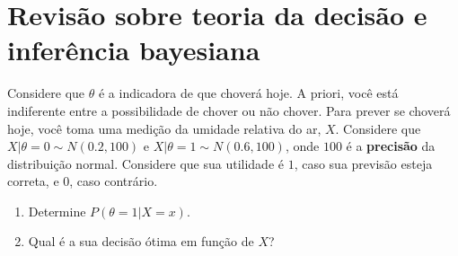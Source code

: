 \section{Revisão sobre teoria da decisão e 
         inferência bayesiana}

\begin{exercise}
 Considere que $\theta$ é a
 indicadora de que choverá hoje.
 A priori, você está indiferente entre 
 a possibilidade de chover ou não chover.
 Para prever se choverá hoje, 
 você toma uma medição da umidade relativa do ar, $X$.
 Considere que $X|\theta=0 \sim N(0.2,100)$ e 
 $X|\theta=1 \sim N(0.6,100)$,
 onde $100$ é a \textbf{precisão} da distribuição normal.
 Considere que sua utilidade é $1$, 
 caso sua previsão esteja correta,
 e $0$, caso contrário.
 \begin{enumerate}[label=(\alph*)]
  \item Determine $P(\theta=1|X=x)$.
  \item Qual é a sua decisão ótima em função de $X$?
 \end{enumerate}
\end{exercise}

